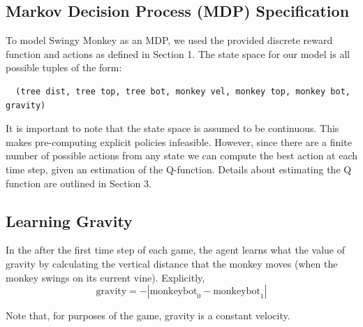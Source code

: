 \documentclass[11pt, oneside]{article}   	%
\begin{document}
\subsection{Markov Decision Process (MDP) Specification}
To model Swingy Monkey as an MDP, we used the provided discrete reward function and actions as defined in Section 1.  The state space for our model is all possible tuples of the form:                                                                                                                                                                  
\noindent\begin{verbatim}
  (tree dist, tree top, tree bot, monkey vel, monkey top, monkey bot, gravity)
\end{verbatim}

It is important to note that the state space is assumed to be continuous.  This makes pre-computing explicit policies infeasible.  However, since there are a finite number of possible actions from any state we can compute the best action at each time step, given an estimation of the Q-function. Details about estimating the Q function are outlined in Section 3.

\subsection{Learning Gravity}
In the after the first time step of each game, the agent learns what the value of gravity by calculating the vertical distance that the monkey moves (when the monkey swings on its current vine).  Explicitly,
$$\text{gravity} = -|\text{monkeybot}_{0} - \text{monkeybot}_{1}|$$

Note that, for purposes of the game, gravity is a constant velocity.
\end{document}
